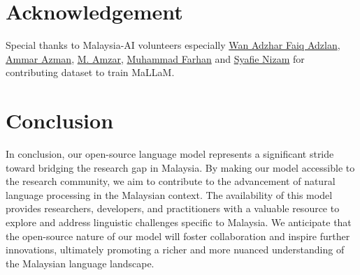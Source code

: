 \documentclass{article}
\begin{document}
\section{Acknowledgement}

Special thanks to Malaysia-AI volunteers especially \href{https://www.linkedin.com/in/wan-adzhar-faiq-adzlan-19a27baa/}{Wan Adzhar Faiq Adzlan}, \href{https://www.linkedin.com/in/ammar-azman/}{Ammar Azman}, \href{https://www.linkedin.com/in/amzar96/}{M. Amzar}, \href{https://www.linkedin.com/in/muhammad-farhan-helmy-0529501a7/}{Muhammad Farhan} and \href{https://www.linkedin.com/in/syafie-nizam/}{Syafie Nizam} for contributing dataset to train MaLLaM.

\section{Conclusion}

In conclusion, our open-source language model represents a significant stride toward bridging the research gap in Malaysia. By making our model accessible to the research community, we aim to contribute to the advancement of natural language processing in the Malaysian context. The availability of this model provides researchers, developers, and practitioners with a valuable resource to explore and address linguistic challenges specific to Malaysia. We anticipate that the open-source nature of our model will foster collaboration and inspire further innovations, ultimately promoting a richer and more nuanced understanding of the Malaysian language landscape.

{}

\end{document}
